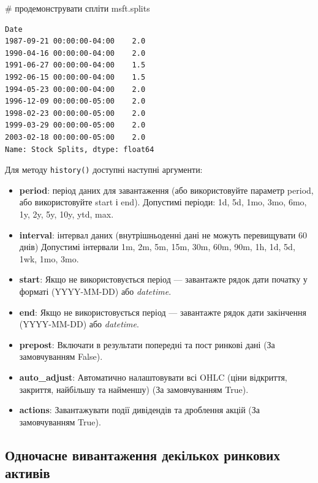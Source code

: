 \documentclass[
  letterpaper,
]{report}
\newenvironment{Shaded}{\begin{snugshade}}{\end{snugshade}}
\newcommand{\CommentTok}[1]{\textcolor[rgb]{0.37,0.37,0.37}{#1}}
\newcommand{\NormalTok}[1]{\textcolor[rgb]{0.00,0.23,0.31}{#1}}
\providecommand{\tightlist}{%
  \setlength{\itemsep}{0pt}\setlength{\parskip}{0pt}}\usepackage{longtable,booktabs,array}
\begin{document}
\begin{Shaded}
\begin{Highlighting}[]
\CommentTok{\# продемонструвати спліти}
\NormalTok{msft.splits}
\end{Highlighting}
\end{Shaded}

\begin{verbatim}
Date
1987-09-21 00:00:00-04:00    2.0
1990-04-16 00:00:00-04:00    2.0
1991-06-27 00:00:00-04:00    1.5
1992-06-15 00:00:00-04:00    1.5
1994-05-23 00:00:00-04:00    2.0
1996-12-09 00:00:00-05:00    2.0
1998-02-23 00:00:00-05:00    2.0
1999-03-29 00:00:00-05:00    2.0
2003-02-18 00:00:00-05:00    2.0
Name: Stock Splits, dtype: float64
\end{verbatim}

Для методу \texttt{history()} доступні наступні аргументи:

\begin{itemize}
\tightlist
\item
  \textbf{period}: період даних для завантаження (або використовуйте
  параметр period, або використовуйте start і end). Допустимі періоди:
  1d, 5d, 1mo, 3mo, 6mo, 1y, 2y, 5y, 10y, ytd, max.
\item
  \textbf{interval}: інтервал даних (внутрішньоденні дані не можуть
  перевищувати 60 днів) Допустимі інтервали 1m, 2m, 5m, 15m, 30m, 60m,
  90m, 1h, 1d, 5d, 1wk, 1mo, 3mo.
\item
  \textbf{start}: Якщо не використовується період --- завантажте рядок
  дати початку у форматі (YYYY-MM-DD) або \emph{datetime}.
\item
  \textbf{end}: Якщо не використовується період --- завантажте рядок
  дати закінчення (YYYY-MM-DD) або \emph{datetime}.
\item
  \textbf{prepost}: Включати в результати попередні та пост ринкові дані
  (За замовчуванням False).
\item
  \textbf{auto\_adjust}: Автоматично налаштовувати всі OHLC (ціни
  відкриття, закриття, найбільшу та найменшу) (За замовчуванням True).
\item
  \textbf{actions}: Завантажувати події дивідендів та дроблення акцій
  (За замовчуванням True).
\end{itemize}

\hypertarget{ux43eux434ux43dux43eux447ux430ux441ux43dux435-ux432ux438ux432ux430ux43dux442ux430ux436ux435ux43dux43dux44f-ux434ux435ux43aux456ux43bux44cux43aux43eux445-ux440ux438ux43dux43aux43eux432ux438ux445-ux430ux43aux442ux438ux432ux456ux432}{%
\subsection{Одночасне вивантаження декількох ринкових
активів}\label{ux43eux434ux43dux43eux447ux430ux441ux43dux435-ux432ux438ux432ux430ux43dux442ux430ux436ux435ux43dux43dux44f-ux434ux435ux43aux456ux43bux44cux43aux43eux445-ux440ux438ux43dux43aux43eux432ux438ux445-ux430ux43aux442ux438ux432ux456ux432}}
\end{document}
